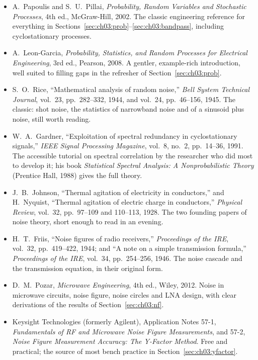 \furtherreading
\begin{itemize}
\item A.~Papoulis and S.~U.~Pillai, \emph{Probability, Random Variables and Stochastic Processes}, 4th ed.,
McGraw-Hill, 2002. The classic engineering reference for everything in
Sections~\ref{sec:ch03:prob}--\ref{sec:ch03:bandpass}, including cyclostationary processes.
\item A.~Leon-Garcia, \emph{Probability, Statistics, and Random Processes for Electrical Engineering}, 3rd ed.,
Pearson, 2008. A gentler, example-rich introduction, well suited to filling gaps in the refresher of
Section~\ref{sec:ch03:prob}.
\item S.~O.~Rice, ``Mathematical analysis of random noise,'' \emph{Bell System Technical Journal}, vol.~23,
pp.~282--332, 1944, and vol.~24, pp.~46--156, 1945. The classic: shot noise, the statistics of narrowband
noise and of a sinusoid plus noise, still worth reading.
\item W.~A.~Gardner, ``Exploitation of spectral redundancy in cyclostationary signals,'' \emph{IEEE Signal
Processing Magazine}, vol.~8, no.~2, pp.~14--36, 1991. The accessible tutorial on spectral correlation by the
researcher who did most to develop it; his book \emph{Statistical Spectral Analysis: A Nonprobabilistic Theory}
(Prentice Hall, 1988) gives the full theory.
\item J.~B.~Johnson, ``Thermal agitation of electricity in conductors,'' and H.~Nyquist, ``Thermal agitation of
electric charge in conductors,'' \emph{Physical Review}, vol.~32, pp.~97--109 and 110--113, 1928. The two
founding papers of noise theory, short enough to read in an evening.
\item H.~T.~Friis, ``Noise figures of radio receivers,'' \emph{Proceedings of the IRE}, vol.~32, pp.~419--422,
1944; and ``A note on a simple transmission formula,'' \emph{Proceedings of the IRE}, vol.~34, pp.~254--256,
1946. The noise cascade and the transmission equation, in their original form.
\item D.~M.~Pozar, \emph{Microwave Engineering}, 4th ed., Wiley, 2012. Noise in microwave circuits, noise figure,
noise circles and LNA design, with clear derivations of the results of Section~\ref{sec:ch03:nf}.
\item Keysight Technologies (formerly Agilent), Application Notes 57-1, \emph{Fundamentals of RF and Microwave
Noise Figure Measurements}, and 57-2, \emph{Noise Figure Measurement Accuracy: The Y-Factor Method}. Free and
practical; the source of most bench practice in Section~\ref{sec:ch03:yfactor}.

\end{itemize}
